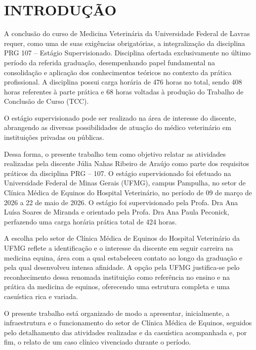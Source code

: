 \chapter{INTRODUÇÃO}
\label{cap:introducao}

A conclusão do curso de Medicina Veterinária da Universidade Federal de
Lavras requer, como uma de suas exigências obrigatórias, a
integralização da disciplina PRG 107 -- Estágio Supervisionado.
Disciplina ofertada exclusivamente no último período da referida
graduação, desempenhando papel fundamental na consolidação e aplicação
dos conhecimentos teóricos no contexto da prática profissional. A
disciplina possui carga horária de 476 horas no total, sendo 408 horas
referentes à parte prática e 68 horas voltadas à produção do Trabalho de
Conclusão de Curso (TCC).

O estágio supervisionado pode ser realizado na área de interesse do
discente, abrangendo as diversas possibilidades de atuação do médico
veterinário em instituições privadas ou públicas.

Dessa forma, o presente trabalho tem como objetivo relatar as atividades
realizadas pela discente Júlia Nahas Ribeiro de Araújo como parte dos
requisitos práticos da disciplina PRG -- 107. O estágio supervisionado
foi efetuado na Universidade Federal de Minas Gerais (UFMG), campus
Pampulha, no setor de Clínica Médica de Equinos do Hospital Veterinário,
no período de 09 de março de 2026 a 22 de maio de 2026. O estágio foi
supervisionado pela Profa. Dra Ana Luísa Soares de Miranda e orientado
pela Profa. Dra Ana Paula Peconick, perfazendo uma carga horária prática
total de 424 horas.

A escolha pelo setor de Clínica Médica de Equinos do Hospital
Veterinário da UFMG reflete a identificação e o interesse da discente em
seguir carreira na medicina equina, área com a qual estabeleceu contato
ao longo da graduação e pela qual desenvolveu intensa afinidade. A opção
pela UFMG justifica-se pelo reconhecimento dessa renomada instituição
como referência no ensino e na prática da medicina de equinos,
oferecendo uma estrutura completa e uma casuística rica e variada.

O presente trabalho está organizado de modo a apresentar, inicialmente,
a infraestrutura e o funcionamento do setor de Clínica Médica de
Equinos, seguidos pelo detalhamento das atividades realizadas e da
casuística acompanhada e, por fim, o relato de um caso clínico
vivenciado durante o período.
